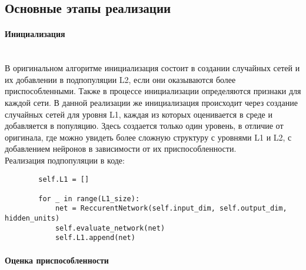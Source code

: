 \documentclass[a4paper,12pt]{article}
\begin{document}
\subsection{Основные этапы реализации}

\paragraph{Инициализация}~\\ 

В оригинальном алгоритме инициализация состоит в создании случайных сетей и их добавлении в подпопуляции L2, если они оказываются более приспособленными. Также в процессе инициализации определяются признаки для каждой сети. В данной реализации же инициализация происходит через создание случайных сетей для уровня L1, каждая из которых оценивается в среде и добавляется в популяцию. Здесь создается только один уровень, в отличие от оригинала, где можно увидеть более сложную структуру с уровнями L1 и L2, с добавлением нейронов в зависимости от их приспособленности.~\\
Реализация подпопуляции в коде: 
    \begin{itemize}
	
	\begin{lstlisting}
		self.L1 = []
        
        for _ in range(L1_size):
            net = ReccurentNetwork(self.input_dim, self.output_dim, hidden_units)
            self.evaluate_network(net)
            self.L1.append(net)
	\end{lstlisting}
    \end{itemize}
  
\paragraph{Оценка приспособленности}~\\ 
\end{document}

